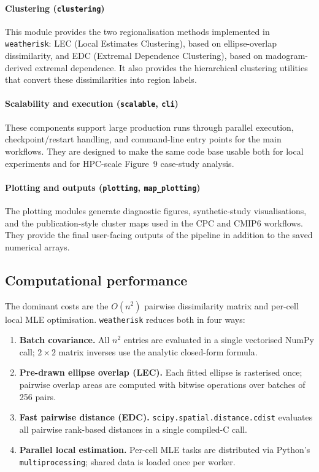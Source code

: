 \documentclass[preprint,12pt,a4paper]{elsarticle}
\newcommand{\revb}[1]{{#1}}
\begin{document}
\paragraph{Clustering (\texttt{clustering})}
This module provides the two regionalisation methods implemented in
\texttt{weatherisk}: LEC (Local Estimates Clustering), based on
ellipse-overlap dissimilarity, and EDC (Extremal Dependence
Clustering), based on madogram-derived extremal dependence. It also provides
the hierarchical clustering utilities that convert these
dissimilarities into region labels.

\paragraph{Scalability and execution (\texttt{scalable}, \texttt{cli})}
These components support large production runs through parallel
execution, checkpoint/restart handling, and command-line entry points
for the main workflows. They are designed to make the same code base
usable both for local experiments and for HPC-scale Figure~9
\revb{case-study analysis}.

\paragraph{Plotting and outputs (\texttt{plotting}, \texttt{map\_plotting})}
The plotting modules generate diagnostic figures, synthetic-study
visualisations, and the publication-style cluster maps used in the CPC
and CMIP6 workflows. They provide the final user-facing outputs of the
pipeline in addition to the saved numerical arrays.

\subsection{Computational performance}
\label{sec:performance}

The dominant costs are the $O(n^2)$ pairwise dissimilarity matrix and
per-cell local MLE optimisation.
\texttt{weatherisk} reduces both in four ways:

\begin{enumerate}
\item \textbf{Batch covariance.}
  All $n^2$ entries are evaluated in a single vectorised NumPy call;
  $2\times 2$ matrix inverses use the analytic closed-form formula.

\item \textbf{Pre-drawn ellipse overlap (LEC).}
  Each fitted ellipse is rasterised once; pairwise overlap areas
  are computed with bitwise operations over batches of 256 pairs.

\item \textbf{Fast pairwise distance (EDC).}
  \texttt{scipy.spatial.distance.\allowbreak{}cdist} evaluates all
  pairwise rank-based distances in a single compiled-C call.

\item \textbf{Parallel local estimation.}
  Per-cell MLE tasks are distributed via Python's
  \texttt{multiprocessing}; shared data is loaded once per worker.
\end{enumerate}
\end{document}
